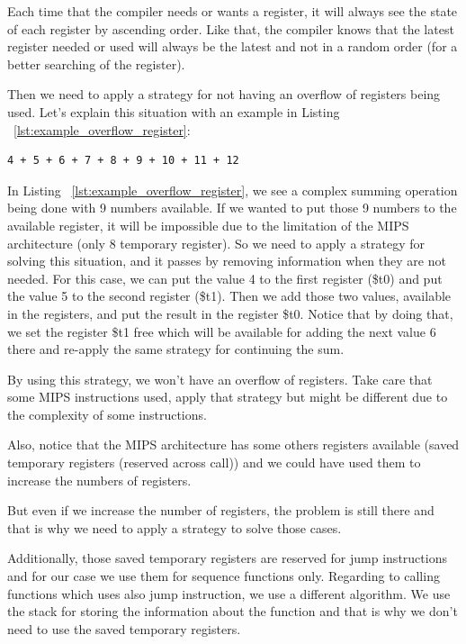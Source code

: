 \documentclass[
  oneside,
  11pt, a4paper,
  footinclude=true,
  headinclude=true,
  cleardoublepage=empty
]{scrbook}
\begin{document}
Each time that the compiler needs or wants a register, it will always see the state of each register by ascending order. Like that, the compiler knows that the latest register needed or used will  always be the latest and not in a random order (for a better searching of the register).

Then we need to apply a strategy for not having an overflow of registers being used.
Let's explain this situation with an example in Listing ~\ref{lst:example_overflow_register}:

\begin{lstlisting}[caption={Example of a sum operation with some numbers},label={lst:example_overflow_register}]
  4 + 5 + 6 + 7 + 8 + 9 + 10 + 11 + 12 
\end{lstlisting}

In Listing ~\ref{lst:example_overflow_register}, we see a complex summing operation being done with 9 numbers available. 
If we wanted to put those 9 numbers to the available register, it will be impossible due to the limitation of the MIPS architecture (only 8 temporary register).
So we need to apply a strategy for solving this situation, and it passes by removing information when they are not needed.
For this case, we can put the value 4 to the first register (\$t0) and put the value 5 to the second register (\$t1). Then we add those two values, available in the registers, and put the result in the register \$t0. Notice that by doing that, we set the register \$t1 free which will be available for adding the next value 6 there and re-apply the same strategy for continuing the sum. 

By using this strategy, we won't have an overflow of registers. Take care that some MIPS instructions used, apply that strategy but might be different due to the complexity of some instructions.

Also, notice that the MIPS architecture has some others registers available (saved temporary registers (reserved across call)) and we could have used them to increase the numbers of registers.

But even if we increase the number of registers, the problem is still there and that is why we need to apply a strategy to solve those cases.

Additionally, those saved temporary registers are reserved for jump instructions and for our case we use them for sequence functions only. Regarding to calling functions which uses also jump instruction, we use a different algorithm. We use the stack for storing the information about the function and that is why we don't need to use the saved temporary registers.
\end{document}
